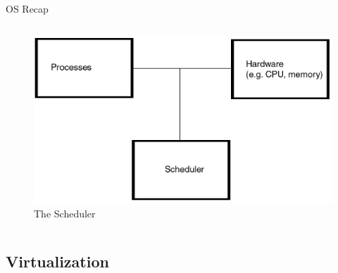 \begin{frame}{OS Recap}
\begin{columns}[T]
\begin{column}{.5\textwidth}
\begin{figure}[ht]
				\vspace*{-0.7cm}
				\caption{The Scheduler}
				\includegraphics[height=0.3\textheight]{img/scheduler.png}
			\end{figure}
		\end{column}
	\end{columns}
\end{frame}

\subsection{Virtualization}


